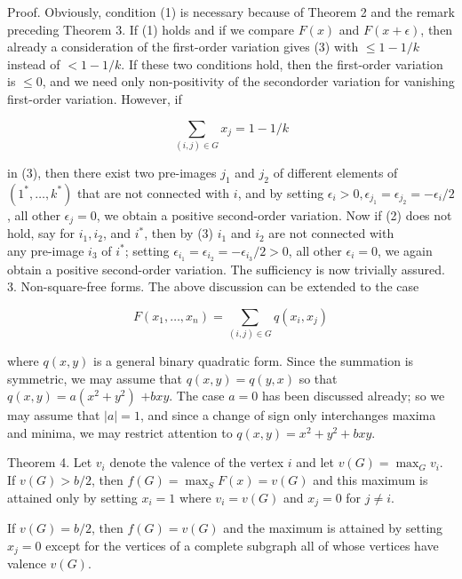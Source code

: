 \documentclass[10pt]{article}
\begin{document}
Proof. Obviously, condition (1) is necessary because of Theorem 2 and the remark preceding Theorem 3. If (1) holds and if we compare \(F(x)\) and \(F(x+\epsilon)\), then already a consideration of the first-order variation gives (3) with \(\leqslant 1-1 / k\) instead of \(<1-1 / k\). If these two conditions hold, then the first-order variation is \(\leqslant 0\), and we need only non-positivity of the secondorder variation for vanishing first-order variation. However, if

\[
\sum_{(i, j) \in G} x_{j}=1-1 / k
\]

in (3), then there exist two pre-images \(j_{1}\) and \(j_{2}\) of different elements of \(\left(1^{*}, \ldots, k^{*}\right)\) that are not connected with \(i\), and by setting \(\epsilon_{i}>0, \epsilon_{j_{1}}=\epsilon_{j_{2}}=-\epsilon_{i} / 2\), all other \(\epsilon_{j}=0\), we obtain a positive second-order variation. Now if (2) does not hold, say for \(i_{1}, i_{2}\), and \(i^{*}\), then by (3) \(i_{1}\) and \(i_{2}\) are not connected with\\
any pre-image \(i_{3}\) of \(i^{*}\); setting \(\epsilon_{i_{1}}=\epsilon_{i_{2}}=-\epsilon_{i_{3}} / 2>0\), all other \(\epsilon_{i}=0\), we again obtain a positive second-order variation. The sufficiency is now trivially assured.\\
3. Non-square-free forms. The above discussion can be extended to the case

\[
F\left(x_{1}, \ldots, x_{n}\right)=\sum_{(i, j) \in G} q\left(x_{i}, x_{j}\right)
\]

where \(q(x, y)\) is a general binary quadratic form. Since the summation is symmetric, we may assume that \(q(x, y)=q(y, x)\) so that \(q(x, y)=a\left(x^{2}+y^{2}\right)\) \(+b x y\). The case \(a=0\) has been discussed already; so we may assume that \(|a|=1\), and since a change of sign only interchanges maxima and minima, we may restrict attention to \(q(x, y)=x^{2}+y^{2}+b x y\).

Theorem 4. Let \(v_{i}\) denote the valence of the vertex \(i\) and let \(v(G)=\max _{G} v_{i}\).\\
If \(v(G)>b / 2\), then \(f(G)=\max _{S} F(x)=v(G)\) and this maximum is attained only by setting \(x_{i}=1\) where \(v_{i}=v(G)\) and \(x_{j}=0\) for \(j \neq i\).

If \(v(G)=b / 2\), then \(f(G)=v(G)\) and the maximum is attained by setting \(x_{j}=0\) except for the vertices of a complete subgraph all of whose vertices have valence \(v(G)\).
\end{document}

